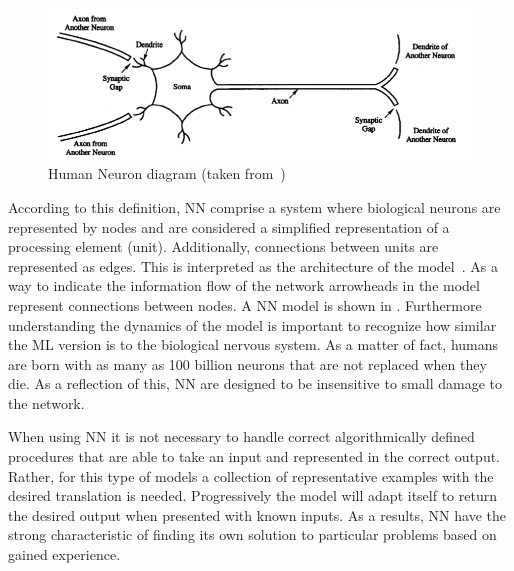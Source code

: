 \begin{figure}[htbp]
  \centering
  \includegraphics[width=\textwidth]{images/neuron}
  \caption{ Human Neuron diagram (taken from~\cite{fausett93}) }
  \label{fig:humanNeuron}
\end{figure}

According to this definition,  \ac{NN} comprise a system where biological neurons are represented by 
nodes and are considered a simplified representation of a processing element (unit). Additionally, 
connections between units are represented as edges. This is interpreted as the architecture of the 
model~\cite{fausett93}. As a way to indicate the information flow of the network arrowheads in the 
model represent connections between nodes. A \ac{NN} model is shown in . 
Furthermore understanding the dynamics of the model 
is important to recognize how similar the \ac{ML} version is to the biological nervous system. As a 
matter of fact, humans are born with as many as 100 billion neurons that are not replaced when they 
die. As a reflection of this, \ac{NN} are designed to be insensitive to small damage to the network. 

When using \ac{NN} it is not necessary to handle correct algorithmically defined procedures that are 
able to take an input and represented in the correct output. Rather, for this type of models a 
collection of representative examples with the desired translation is needed. Progressively the model 
will adapt itself to return the desired output when presented with known inputs. As a results, \ac{NN}  
have the strong characteristic of finding its  own solution to particular problems based on gained 
experience. 

